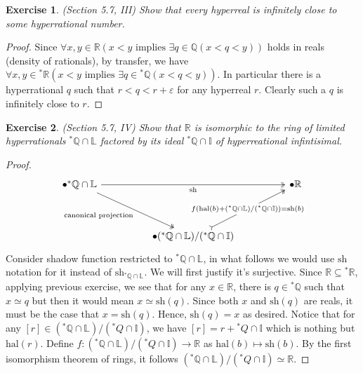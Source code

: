 \documentclass[a4paper, 11pt, openany]{book}
\theoremstyle{plain}
\newtheorem{exercise}{Exercise}[chapter]
\theoremstyle{plain}
\newcommand{\Q}{\mathbb{Q}}
\newcommand{\R}{\mathbb{R}}
\newcommand{\I}{\mathbb{I}}
\newcommand{\ep}{\varepsilon}
\newcommand{\hyp}{{}^*}
\newcommand{\hal}{\text{hal}}
\newcommand{\sh}{\text{sh}}
\begin{document}
  \begin{exercise}
    (Section 5.7, III)
    Show that every hyperreal is infinitely close to some hyperrational number.
  \end{exercise}
  \begin{proof}
    Since $\forall x,y \in \R (x<y \text{ implies } \exists q \in \Q (x<q<y))$ holds in reals (density of rationals), by transfer, we have $\forall x,y \in \hyp \R (x<y \text{ implies } \exists q \in \hyp \Q (x<q<y))$. In particular there is a hyperrational $q$ such that $r<q<r+\ep$ for any hyperreal $r$. Clearly such a $q$ is infinitely close to $r$.
  \end{proof}

  \begin{exercise}
    (Section 5.7, IV)
    Show that $\R$ is isomorphic to the ring of limited hyperrationals $\hyp \Q \cap \mathbb{L}$ factored by its ideal $\hyp \Q \cap \I$ of hyperreational infintisimal.
  \end{exercise}
  \begin{proof}
    \[\begin{tikzcd}
      {\bullet {}^*\mathbb{Q} \cap \mathbb{L}} &&&& {\bullet \mathbb{R}} \\
      \\
      && {\bullet ({}^* \mathbb{Q} \cap \mathbb{L})/({}^* \mathbb{Q} \cap \mathbb{I})}
      \arrow["{\text{canonical projection}}"', two heads, from=1-1, to=3-3]
      \arrow["{f(\text{hal}(b)+({}^* \mathbb{Q} \cap \mathbb{L})/({}^* \mathbb{Q} \cap \mathbb{I}))=\text{sh}(b)}"{description}, tail, two heads, from=3-3, to=1-5]
      \arrow["{\text{sh}}"', two heads, from=1-1, to=1-5]
    \end{tikzcd}\]
    Consider shadow function restricted to $\hyp \Q \cap \mathbb{L}$, in what follows we would use $\sh$ notation for it instead of $\sh_{\hyp \Q \cap \mathbb{L}}$. We will first justify it's surjective. Since $\R \subseteq \hyp \R$, applying previous exercise, we see that for any $x \in \R$, there is $q \in \hyp \Q$ such that $x \simeq q$ but then it would mean $x \simeq \sh(q)$. Since both $x$ and $\sh(q)$ are reals, it must be the case that $x=\sh(q)$. Hence, $\sh(q)=x$ as desired. Notice that for any $[r] \in (\hyp \Q \cap \mathbb{L})/(\hyp Q \cap \I)$, we have $[r]=r+\hyp Q \cap \I$ which is nothing but $\hal(r)$. Define $f: (\hyp \Q \cap \mathbb{L})/(\hyp Q \cap \I) \rightarrow \R$ as $\hal(b) \mapsto \sh(b)$. By the first isomorphism theorem of rings, it follows $(\hyp \Q \cap \mathbb{L})/(\hyp Q \cap \I) \simeq \R$.
  \end{proof}
\end{document}
